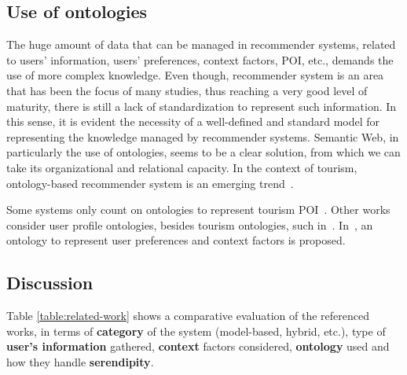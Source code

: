 
\subsection{Use of ontologies}

The huge amount of data that can be managed in recommender systems, related to users' information, users' preferences, context factors, POI, etc.,   demands the use of more complex knowledge. Even though, recommender system is an area that has been the focus of many studies, thus reaching a very good level of maturity, there is still a lack of standardization to represent such information. In this sense, it is evident the necessity of a well-defined and standard model for representing the knowledge managed by recommender systems. Semantic Web, in particularly the use of ontologies, seems to be a clear solution, from which we can take its organizational and relational capacity.
In the context of tourism, ontology-based  recommender  system  is  an  emerging  trend~\cite{borras2014intelligent,yochum2020linked}.

Some systems only count on ontologies to represent tourism  POI~\cite{rajaonarivo2019rec,bahramian_abbaspour_claramunt_2017,garcia2009speta,arigi2018context}. Other works consider user profile ontologies, besides tourism ontologies, such in~\cite{ruotsalo2013smartmuseum}. In~\cite{alonso2012ontology}, an ontology to represent user preferences and context factors is proposed.






\subsection{Discussion}

Table \ref{table:related-work} shows a comparative evaluation  of the referenced works, in terms of \textbf{category} of the system (model-based, hybrid, etc.), type of \textbf{user's information} gathered, \textbf{context} factors considered, \textbf{ontology} used and how they handle \textbf{serendipity}. 

